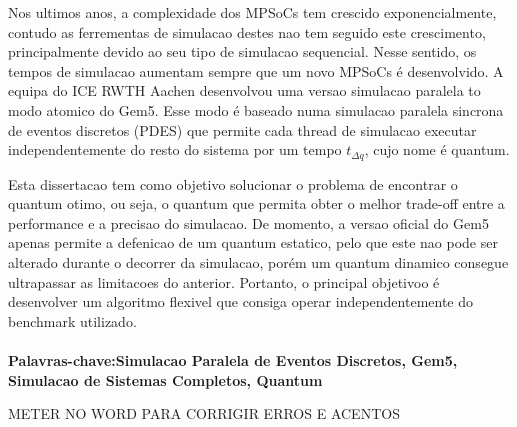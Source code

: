 

Nos ultimos anos, a complexidade dos MPSoCs tem crescido exponencialmente, contudo as ferrementas de simulacao destes nao tem seguido este crescimento, principalmente devido ao seu tipo de simulacao sequencial. Nesse sentido, os tempos de simulacao aumentam sempre que um novo MPSoCs é desenvolvido. A equipa do ICE RWTH Aachen desenvolvou uma versao simulacao paralela to modo atomico do Gem5. Esse modo é baseado numa simulacao paralela sincrona de eventos discretos (PDES) que permite cada thread de simulacao executar independentemente do resto do sistema por um tempo $t_{\Delta q}$, cujo nome é quantum.

Esta dissertacao tem como objetivo solucionar o problema de encontrar o quantum otimo, ou seja, o quantum que permita obter o melhor trade-off entre a performance e a precisao do simulacao. De momento, a versao oficial do Gem5 apenas permite a defenicao de um quantum estatico, pelo que este nao pode ser alterado durante o decorrer da simulacao, porém um quantum dinamico consegue ultrapassar as limitacoes do anterior. Portanto, o principal objetivoo é desenvolver um algoritmo flexivel que consiga operar independentemente do benchmark utilizado. 

\paragraph{}\textbf{Palavras-chave:Simulacao Paralela de Eventos Discretos, Gem5, Simulacao de Sistemas Completos, Quantum} 

METER NO WORD PARA CORRIGIR ERROS E ACENTOS